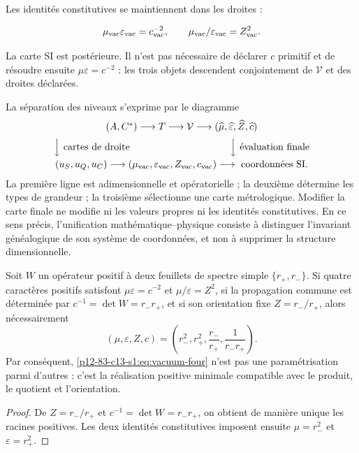 Les identités constitutives se maintiennent dans les droites :

\begin{equation}
\mu_{\rm vac}\varepsilon_{\rm vac}=c_{\rm vac}^{-2},
\qquad
\mu_{\rm vac}/\varepsilon_{\rm vac}=Z_{\rm vac}^2.
\end{equation}

La carte SI est postérieure. Il n'est pas nécessaire de déclarer \(c\) primitif et de résoudre ensuite \(\mu\varepsilon=c^{-2}\) : les trois objets descendent conjointement de \(\mathcal V\) et des droites déclarées.

La séparation des niveaux s'exprime par le diagramme
\[
\begin{array}{c}
(A,C^*)\longrightarrow T\longrightarrow\mathcal V
\longrightarrow
(\widehat\mu,\widehat\varepsilon,\widehat Z,\widehat c)
\\[2mm]
\Big\downarrow\text{ cartes de droite}\hspace{36mm}
\Big\downarrow\text{ évaluation finale}
\\[2mm]
(u_S,u_Q,u_C)\longrightarrow
(\mu_{\rm vac},\varepsilon_{\rm vac},Z_{\rm vac},c_{\rm vac})
\longrightarrow\text{ coordonnées SI}.
\end{array}
\]
La première ligne est adimensionnelle et opératorielle ; la deuxième détermine les types de
grandeur ; la troisième sélectionne une carte métrologique. Modifier la carte finale
ne modifie ni les valeurs propres ni les identités constitutives. En ce
sens précis, l'unification mathématique--physique consiste à distinguer
l'invariant généalogique de son système de coordonnées, et non à supprimer la
structure dimensionnelle.

\begin{proposition}
Soit \(W\) un opérateur positif à deux feuillets de spectre simple
\(\{r_+,r_-\}\). Si quatre caractères positifs satisfont
\(\mu\varepsilon=c^{-2}\) et \(\mu/\varepsilon=Z^2\), si la propagation
commune est déterminée par \(c^{-1}=\det W=r_-r_+\), et si son orientation
fixe \(Z=r_-/r_+\), alors nécessairement
\[
(\mu,\varepsilon,Z,c)
=\left(r_-^2,r_+^2,\frac{r_-}{r_+},\frac1{r_-r_+}\right).
\]
Par conséquent, \cref{p12-83-c13-s1:eq:vacuum-four} n'est pas une paramétrisation parmi d'autres :
c'est la réalisation positive minimale compatible avec le produit, le quotient et
l'orientation.
\end{proposition}

\begin{proof}
De \(Z=r_-/r_+\) et \(c^{-1}=\det W=r_-r_+\), on obtient de manière unique les
racines positives. Les deux identités constitutives imposent ensuite
\(\mu=r_-^2\) et \(\varepsilon=r_+^2\).
\end{proof}

